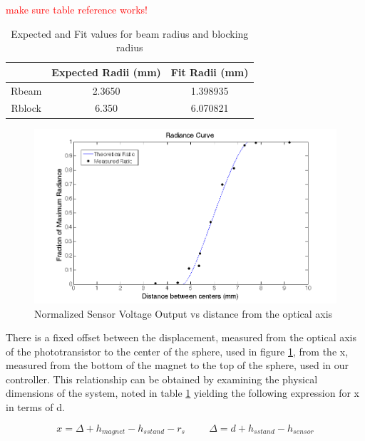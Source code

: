 \documentclass{article}
\newcommand{\xxx}[1]{\textcolor{red}{#1}}
\theoremstyle{plain}
\theoremstyle{definition}
\theoremstyle{remark}
\begin{document}
\xxx{make sure table reference works!}

\begin{table}
\begin{center}
    \begin{tabular}{|c|c|c|}
        \hline
        ~      & Expected Radii (mm) & Fit Radii (mm) \\ \hline
        Rbeam  & 2.3650              & 1.398935       \\ 
        Rblock & 6.350               & 6.070821       \\
        \hline
    \end{tabular}
\end{center}
\label{Q1_dt2}
\caption{Expected and Fit values for beam radius and blocking radius}
\end{table}

\begin{figure}
\begin{center}
\includegraphics[width = 15cm]{SensorRadianceCurve.png}
\end{center}
\caption{Normalized Sensor Voltage Output vs distance from the optical axis}
\label{Q1_d1}
\end{figure}

There is a fixed offset between the displacement, measured from the optical axis of the phototransistor to the center of the sphere, used in figure \ref{Q1_d1}, from the x, measured from the bottom of the magnet to the top of the sphere, used in our controller.  This relationship can be obtained by examining the physical dimensions of the system, noted in table \ref{Q1_dt2} yielding the following expression for x in terms of d.

$$ x = \Delta + h_{magnet} - h_{s stand} - r_{s} \hspace{1cm} \Delta = d + h_{s stand} - h_{sensor} $$
\end{document}
